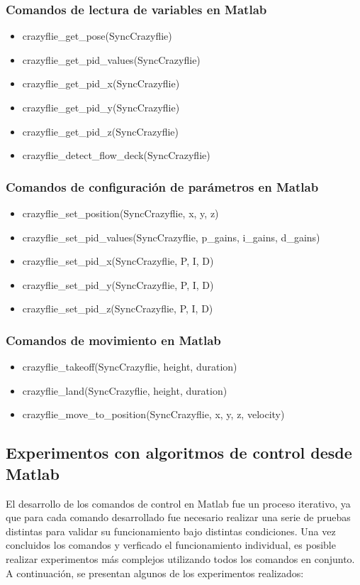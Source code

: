 \subsubsection{Comandos de lectura de variables en Matlab}
\begin{itemize}
	\item crazyflie\_get\_pose(SyncCrazyflie)
	\item crazyflie\_get\_pid\_values(SyncCrazyflie)
	\item crazyflie\_get\_pid\_x(SyncCrazyflie)
	\item crazyflie\_get\_pid\_y(SyncCrazyflie)
	\item crazyflie\_get\_pid\_z(SyncCrazyflie)
	\item crazyflie\_detect\_flow\_deck(SyncCrazyflie)
\end{itemize}

\subsubsection{Comandos de configuración de parámetros en Matlab}
\begin{itemize}
	\item crazyflie\_set\_position(SyncCrazyflie, x, y, z)
	\item crazyflie\_set\_pid\_values(SyncCrazyflie, p\_gains, i\_gains, d\_gains)
	\item crazyflie\_set\_pid\_x(SyncCrazyflie, P, I, D)
	\item crazyflie\_set\_pid\_y(SyncCrazyflie, P, I, D)
	\item crazyflie\_set\_pid\_z(SyncCrazyflie, P, I, D)
\end{itemize}

\subsubsection{Comandos de movimiento en Matlab}
\begin{itemize}
	\item crazyflie\_takeoff(SyncCrazyflie, height, duration)
	\item crazyflie\_land(SyncCrazyflie, height, duration)
	\item crazyflie\_move\_to\_position(SyncCrazyflie, x, y, z, velocity)
\end{itemize}
\vspace{5mm}
	
\subsection{Experimentos con algoritmos de control desde Matlab}
El desarrollo de los comandos de control en Matlab fue un proceso iterativo, ya que para cada comando desarrollado fue necesario realizar una serie de pruebas distintas para validar su funcionamiento bajo distintas condiciones. Una vez concluidos los comandos y verficado el funcionamiento individual, es posible realizar experimentos más complejos utilizando todos los comandos en conjunto. A continuación, se presentan algunos de los experimentos realizados:

